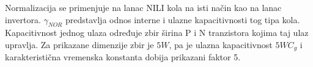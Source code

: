 Normalizacija se primenjuje na lanac NILI kola na isti način kao na lanac invertora. $\gamma_{NOR}$ predstavlja odnos interne i ulazne kapacitivnosti tog tipa kola. Kapacitivnost jednog ulaza određuje zbir širina P i N tranzistora kojima taj ulaz upravlja. Za prikazane dimenzije zbir je $5W$, pa je ulazna kapacitivnost $5WC_g$ i karakteristična vremenska konstanta dobija prikazani faktor 5.
